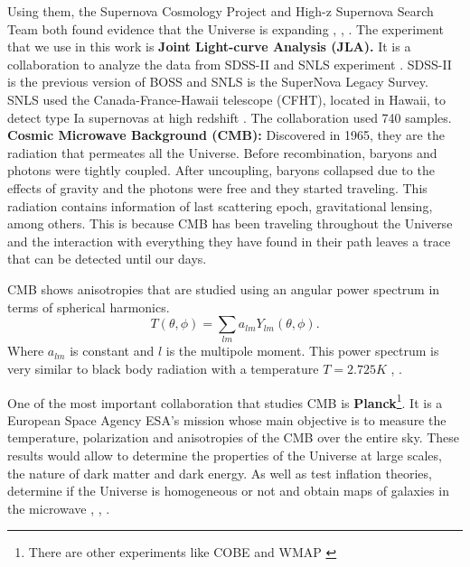 \documentclass[onecolumn,           %
               showpacs,            %
               preprintnumbers,     %
               aps,                 %
               letterpaper,             %
               superscriptaddress,      %
               nofootinbib,         %
               tightenlines,        %
               floats,floatfix      %
               ,usenatbib,
               ]{revtex4-1}
\begin{document}
Using them, the Supernova Cosmology Project and High-z Supernova Search Team both found evidence that the Universe is expanding \cite{supernova1}, \cite{supernova2}, \cite{supernova3}. 
%
%
The experiment that we use in this work is \textbf{Joint Light-curve Analysis (JLA).} It is a collaboration to analyze the data from SDSS-II and SNLS experiment \cite{jla}. SDSS-II is the previous version of BOSS and SNLS is the SuperNova Legacy Survey. SNLS used the Canada-France-Hawaii telescope (CFHT), located in Hawaii, to detect type Ia supernovas at high redshift \cite{snls}. The collaboration used 740 samples. \\

\textbf{Cosmic Microwave Background (CMB):} Discovered in 1965, they are the radiation that permeates all the Universe. Before recombination, baryons and photons were tightly coupled. After uncoupling, baryons collapsed due to the effects of gravity and the photons were free and they started traveling. This radiation contains information of last scattering epoch, gravitational lensing, among others. This is because CMB has been traveling throughout the Universe and the interaction with everything they have found in their path leaves a trace that can be detected until our days.

CMB shows anisotropies that are studied using an angular power spectrum in terms of spherical harmonics.
\begin{equation}
T(\theta, \phi) = \sum_{lm} a_{lm} Y_{lm} \left(\theta, \phi \right) .
\end{equation}
Where $a_{lm}$ is constant and $l$ is the multipole moment. This power spectrum is very similar to black body radiation with a temperature $T = 2.725K$ \cite{CMB1}, \cite{CMB2}.

One of the most important collaboration that studies CMB is \textbf{Planck}\footnote{There are other experiments like COBE \cite{COBE} and WMAP \cite{WMAP}}. It is a European Space Agency ESA's mission whose main objective is to measure the temperature, polarization and anisotropies of the CMB over the entire sky. These results would allow to determine the properties of the Universe at large scales, the nature of dark matter and dark energy. As well as test inflation theories, determine if the Universe is homogeneous or not and obtain maps of galaxies in the microwave \cite{Planck1}, \cite{Planck2}, \cite{Planck3}.\\
\end{document}
